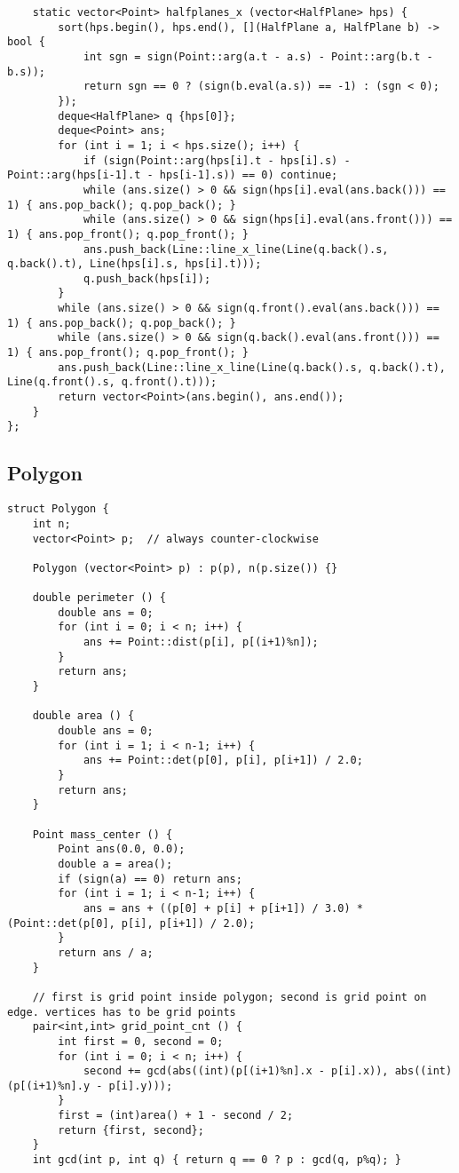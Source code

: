 \documentclass[10pt,landscape]{article}
\begin{document}
\begin{multicols}{2}
\begin{lstlisting}
	static vector<Point> halfplanes_x (vector<HalfPlane> hps) {
		sort(hps.begin(), hps.end(), [](HalfPlane a, HalfPlane b) -> bool {
			int sgn = sign(Point::arg(a.t - a.s) - Point::arg(b.t - b.s));
			return sgn == 0 ? (sign(b.eval(a.s)) == -1) : (sgn < 0);
		});
		deque<HalfPlane> q {hps[0]};
		deque<Point> ans;
		for (int i = 1; i < hps.size(); i++) {
			if (sign(Point::arg(hps[i].t - hps[i].s) - Point::arg(hps[i-1].t - hps[i-1].s)) == 0) continue;
			while (ans.size() > 0 && sign(hps[i].eval(ans.back())) == 1) { ans.pop_back(); q.pop_back(); }
			while (ans.size() > 0 && sign(hps[i].eval(ans.front())) == 1) { ans.pop_front(); q.pop_front(); }
			ans.push_back(Line::line_x_line(Line(q.back().s, q.back().t), Line(hps[i].s, hps[i].t)));
			q.push_back(hps[i]);
		}
		while (ans.size() > 0 && sign(q.front().eval(ans.back())) == 1) { ans.pop_back(); q.pop_back(); }
		while (ans.size() > 0 && sign(q.back().eval(ans.front())) == 1) { ans.pop_front(); q.pop_front(); }
		ans.push_back(Line::line_x_line(Line(q.back().s, q.back().t), Line(q.front().s, q.front().t)));
		return vector<Point>(ans.begin(), ans.end());
	}
};
\end{lstlisting}
\subsection{Polygon}
\begin{lstlisting}
struct Polygon {
	int n;
	vector<Point> p;  // always counter-clockwise

	Polygon (vector<Point> p) : p(p), n(p.size()) {}

	double perimeter () {
		double ans = 0;
		for (int i = 0; i < n; i++) {
			ans += Point::dist(p[i], p[(i+1)%n]);
		}
		return ans;
	}

	double area () {
		double ans = 0;
		for (int i = 1; i < n-1; i++) {
			ans += Point::det(p[0], p[i], p[i+1]) / 2.0;
		}
		return ans;
	}

	Point mass_center () {
		Point ans(0.0, 0.0);
		double a = area();
		if (sign(a) == 0) return ans;
		for (int i = 1; i < n-1; i++) {
			ans = ans + ((p[0] + p[i] + p[i+1]) / 3.0) * (Point::det(p[0], p[i], p[i+1]) / 2.0);
		}
		return ans / a;
	}

	// first is grid point inside polygon; second is grid point on edge. vertices has to be grid points
	pair<int,int> grid_point_cnt () {
		int first = 0, second = 0;
		for (int i = 0; i < n; i++) {
			second += gcd(abs((int)(p[(i+1)%n].x - p[i].x)), abs((int)(p[(i+1)%n].y - p[i].y)));
		}
		first = (int)area() + 1 - second / 2;
		return {first, second};
	}
	int gcd(int p, int q) { return q == 0 ? p : gcd(q, p%q); }


\end{lstlisting}
\end{multicols}
\end{document}

